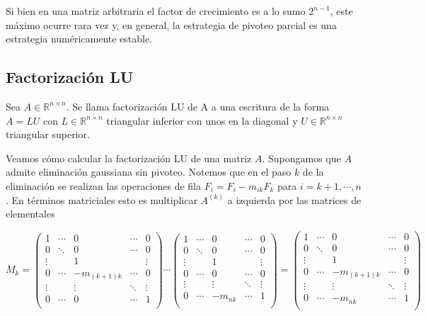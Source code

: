 Si bien en una matriz arbitraria el factor de crecimiento es a lo sumo $2^{n - 1}$, este máximo ocurre rara vez y, en general, la estrategia de pivoteo parcial es una estrategia numéricamente estable.

\subsection{Factorización LU}

\begin{defi}
Sea $A \in \mathbb{R}^{n \times n}$. Se llama factorización LU de A a una escritura de la forma $A = LU$ con $L \in \mathbb{R}^{n \times n}$ triangular inferior con unos en la diagonal y $U \in \mathbb{R}^{n \times n}$ triangular superior.
\end{defi}

Veamos cómo calcular la factorización LU de una matriz $A$. Supongamos que $A$ admite eliminación gaussiana sin pivoteo. Notemos que en el paso $k$ de la eliminación se realizan las operaciones de fila $F_i = F_i - m_{ik} F_k$ para $i = k + 1, \cdots, n$. En términos matriciales esto es multiplicar $A^{(k)}$ a izquierda por las matrices de elementales

\[
M_k = 
\begin{pmatrix} 
1 		& \cdots 	& 0 				& \cdots 	& 0 \\
0 		& \ddots 	& 0 				& \cdots 	& 0 \\
\vdots 	& 			& 1 				& 			& \vdots\\
0		& \cdots		& -m_{(k+1)k} 	& \cdots		& 0\\
\vdots	& 			& \vdots		 	& \ddots		& \vdots\\
0		& \cdots		& 0				& \cdots		& 1\\
\end{pmatrix}
\cdots
\begin{pmatrix} 
1 		& \cdots 	& 0 				& \cdots 	& 0 \\
0 		& \ddots 	& 0 				& \cdots 	& 0 \\
\vdots 	& 			& 1 				& 			& \vdots\\
0		& \cdots		& 0 	& \cdots		& 0\\
\vdots	& 			& \vdots		 	& \ddots		& \vdots\\
0		& \cdots		& -m_{nk}	& \cdots		& 1\\
\end{pmatrix}
=
\begin{pmatrix} 
1 		& \cdots 	& 0 				& \cdots 	& 0 \\
0 		& \ddots 	& 0 				& \cdots 	& 0 \\
\vdots 	& 			& 1 				& 			& \vdots\\
0		& \cdots		& -m_{(k+1)k} 	& \cdots		& 0\\
\vdots	& 			& \vdots		 	& \ddots		& \vdots\\
0		& \cdots		& -m_{nk}	& \cdots		& 1\\
\end{pmatrix}
\]

